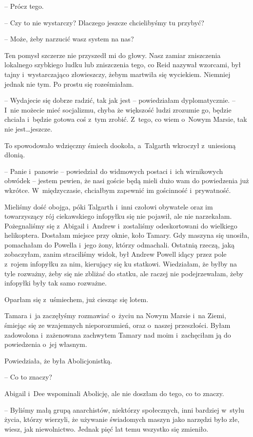 \documentclass[oneside,polish,11pt,sfheadings]{mwbk}
\begin{document}
-- Prócz tego.

-- Czy to nie wystarczy? Dlaczego jeszcze chcielibyśmy tu przybyć?

-- Może, żeby narzucić wasz system na nas?

Ten pomysł szczerze nie przyszedł mi do głowy. Nasz zamiar zniszczenia
lokalnego szybkiego ludku lub zniszczenia tego, co Reid nazywał
wzorcami, był tajny i~wystarczająco złowieszczy, żebym martwiła się
wyciekiem. Niemniej jednak nie tym. Po prostu się roześmiałam.

-- Wydajecie się dobrze radzić, tak jak jest -- powiedziałam
dyplomatycznie. -- I~nie możecie mieć socjalizmu, chyba że większość
ludzi zrozumie go, będzie chciała i~będzie gotowa coś z~tym zrobić. Z~tego, co wiem o~Nowym Marsie, tak nie jest\ldots  jeszcze.

To spowodowało wdzięczny śmiech dookoła, a~Talgarth wkroczył z~uniesioną
dłonią. 

-- Panie i~panowie -- powiedział do widmowych postaci i~ich
wirnikowych obwódek -- jestem pewien, że nasi goście będą mieli dużo wam
do powiedzenia już wkrótce. W~międzyczasie, chciałbym zapewnić im
gościnność i~prywatność.

Mieliśmy dość obojga, póki Talgarth i~inni czołowi obywatele oraz im
towarzyszący rój ciekawskiego infopyłku się nie pojawił, ale nie
narzekałam. Pożegnaliśmy się z~Abigail i~Andrew i~zostaliśmy
odeskortowani do wielkiego helikoptera. Dostałam miejsce przy oknie,
koło Tamary. Gdy maszyna się unosiła, pomachałam do Powella i~jego żony,
którzy odmachali. Ostatnią rzeczą, jaką zobaczyłam, zanim straciliśmy
widok, był Andrew Powell idący przez pole z~rojem infopyłku za nim,
kierujący się ku statkowi. Wiedziałam, że byłby na tyle rozważny, żeby
się nie zbliżać do statku, ale raczej nie podejrzewałam, żeby infopyłki
były tak samo rozważne.

Oparłam się z~uśmiechem, już ciesząc się lotem.

Tamara i~ja zaczęłyśmy rozmawiać o~życiu na Nowym Marsie i~na Ziemi,
śmiejąc się ze wzajemnych nieporozumień, oraz o~naszej przeszłości.
Byłam zadowolona i~zażenowana zachwytem Tamary nad moim i~zachęciłam ją
do powiedzenia o~jej własnym.

Powiedziała, że była Abolicjonistką.

-- Co to znaczy?

Abigail i~Dee wspominali Abolicję, ale nie doszłam do tego, co to
znaczy.

-- Byliśmy małą grupą anarchistów, niektórzy społecznych, inni bardziej w~stylu życia, którzy wierzyli, że używanie świadomych maszyn jako
narzędzi było złe, wiesz, jak niewolnictwo. Jednak pięć lat temu
wszystko się zmieniło.
\end{document}
